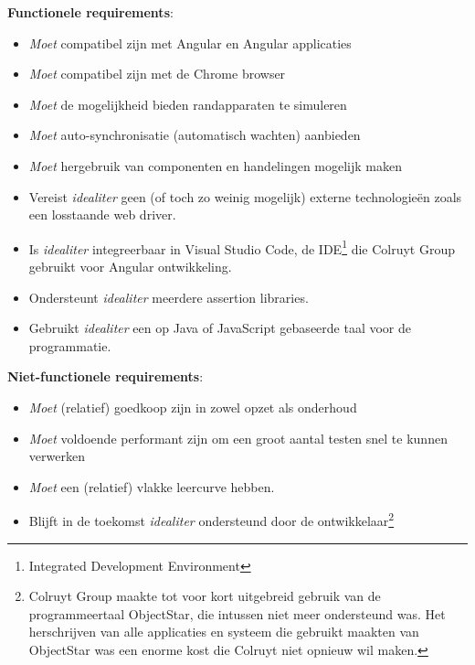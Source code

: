 \textbf{Functionele requirements}:
\begin{itemize}
    \item \emph{Moet} compatibel zijn met Angular en Angular applicaties
    \item \emph{Moet} compatibel zijn met de Chrome browser
    \item \emph{Moet} de mogelijkheid bieden randapparaten te simuleren
    \item \emph{Moet} auto-synchronisatie (automatisch wachten) aanbieden
    \item \emph{Moet} hergebruik van componenten en handelingen mogelijk maken
    \item Vereist \emph{idealiter} geen (of toch zo weinig mogelijk) externe technologieën zoals een losstaande web driver.
    \item Is \emph{idealiter} integreerbaar in Visual Studio Code, de IDE\footnote{Integrated Development Environment} die Colruyt Group gebruikt voor Angular ontwikkeling.
    \item Ondersteunt \emph{idealiter} meerdere assertion libraries.
    \item Gebruikt \emph{idealiter} een op Java of JavaScript gebaseerde taal voor de programmatie.
\end{itemize}

\textbf{Niet-functionele requirements}:
\begin{itemize}
    \item \emph{Moet} (relatief) goedkoop zijn in zowel opzet als onderhoud
    \item \emph{Moet} voldoende performant zijn om een groot aantal testen snel te kunnen verwerken
    \item \emph{Moet} een (relatief) vlakke leercurve hebben.
    \item Blijft in de toekomst \emph{idealiter} ondersteund door de ontwikkelaar\footnote{Colruyt Group maakte tot voor kort uitgebreid gebruik van de programmeertaal ObjectStar, die intussen niet meer ondersteund was. Het herschrijven van alle applicaties en systeem die gebruikt maakten van ObjectStar was een enorme kost die Colruyt niet opnieuw wil maken.}
\end{itemize}